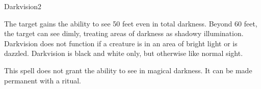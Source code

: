 \begin{spellsection}{Darkvision}{2}
    \begin{spellheader}
    \end{spellheader}
    \begin{spellcontent}
        \begin{spelltargetinginfo}
        \end{spelltargetinginfo}
        \begin{spelleffects}
            \spelleffect The target gains the ability to see 50 feet even in total darkness. Beyond 60 feet, the target can see dimly, treating areas of darkness as shadowy illumination. Darkvision does not function if a creature is in an area of bright light or is dazzled. Darkvision is black and white only, but otherwise like normal sight.
            \spelldur \durlong
        \end{spelleffects}
    \end{spellcontent}
    \begin{spellfooter}
        \spellnotes This spell does not grant the ability to see in magical darkness. It can be made permanent with a  ritual.
        \miscastexplode
    \end{spellfooter}
\end{spellsection}

